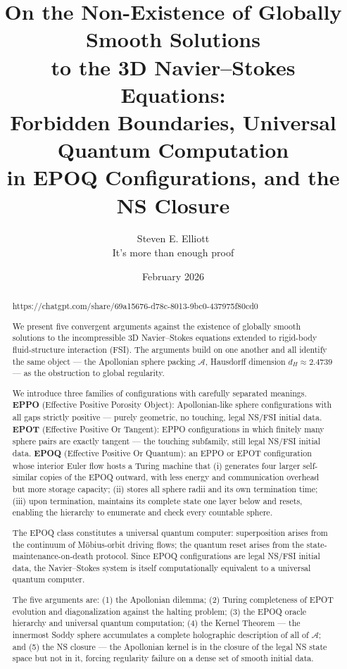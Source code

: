 \documentclass[11pt]{article}
\title{On the Non-Existence of Globally Smooth Solutions\\
to the 3D Navier--Stokes Equations:\\[0.5ex]
Forbidden Boundaries, Universal Quantum Computation\\
in EPOQ Configurations, and the NS Closure}
\author{Steven E. Elliott \\ It's more than enough proof}
\date{February 2026}
\theoremstyle{plain}
\theoremstyle{definition}
\theoremstyle{remark}
\begin{document}
\maketitle

\begin{abstract}

https://chatgpt.com/share/69a15676-d78c-8013-9bc0-437975f80cd0

We present five convergent arguments against the existence of globally smooth
solutions to the incompressible 3D Navier--Stokes equations extended to
rigid-body fluid-structure interaction (FSI). The arguments build on one
another and all identify the same object --- the Apollonian sphere packing
$\mathcal{A}$, Hausdorff dimension $d_H \approx 2.4739$ --- as the
obstruction to global regularity.

We introduce three families of configurations with carefully separated
meanings. \textbf{EPPO} (Effective Positive Porosity Object): Apollonian-like
sphere configurations with all gaps strictly positive --- purely geometric,
no touching, legal NS/FSI initial data. \textbf{EPOT} (Effective Positive Or
Tangent): EPPO configurations in which finitely many sphere pairs are exactly
tangent --- the touching subfamily, still legal NS/FSI initial data.
\textbf{EPOQ} (Effective Positive Or Quantum): an EPPO or EPOT configuration
whose interior Euler flow hosts a Turing machine that (i) generates four
larger self-similar copies of the EPOQ outward, with less energy and
communication overhead but more storage capacity; (ii) stores all sphere
radii and its own termination time; (iii) upon termination, maintains its
complete state one layer below and resets, enabling the hierarchy to enumerate
and check every countable sphere.

The EPOQ class constitutes a universal quantum computer: superposition arises
from the continuum of M\"{o}bius-orbit driving flows; the quantum reset arises
from the state-maintenance-on-death protocol. Since EPOQ configurations are
legal NS/FSI initial data, the Navier--Stokes system is itself computationally
equivalent to a universal quantum computer.

The five arguments are: (1) the Apollonian dilemma; (2) Turing completeness
of EPOT evolution and diagonalization against the halting problem; (3) the
EPOQ oracle hierarchy and universal quantum computation; (4) the Kernel
Theorem --- the innermost Soddy sphere accumulates a complete holographic
description of all of $\mathcal{A}$; and (5) the NS closure --- the
Apollonian kernel is in the closure of the legal NS state space but not in
it, forcing regularity failure on a dense set of smooth initial data.
\end{abstract}
\end{document}
